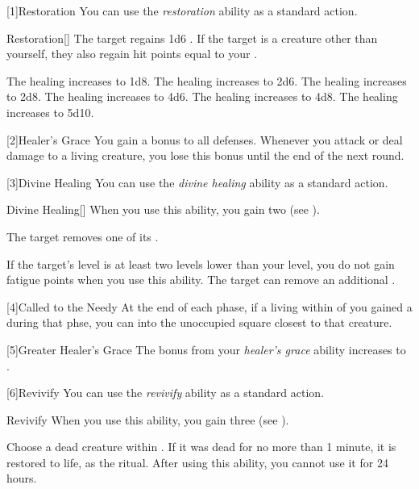         [1]{Restoration} You can use the \textit{restoration} ability as a standard action.
        \begin{freeability}{Restoration}[]
            The target regains 1d6 .
            If the target is a creature other than yourself, they also regain hit points equal to your .

            \rankline
             The healing increases to 1d8.
             The healing increases to 2d6.
             The healing increases to 2d8.
             The healing increases to 4d6.
             The healing increases to 4d8.
             The healing increases to 5d10.
        \end{freeability}

        [2]{Healer's Grace} You gain a  bonus to all defenses.
        Whenever you attack or deal damage to a living creature, you lose this bonus until the end of the next round.

        [3]{Divine Healing} You can use the \textit{divine healing} ability as a standard action.
        \begin{freeability}{Divine Healing}[]
            When you use this ability, you gain two  (see ).

            The target removes one of its .

            \rankline
             If the target's level is at least two levels lower than your level,
                you do not gain fatigue points when you use this ability.
             The target can remove an additional .
        \end{freeability}

        [4]{Called to the Needy} At the end of each phase, if a living  within \distrange of you gained a  during that phse, you can  into the unoccupied square closest to that creature.

        [5]{Greater Healer's Grace} The bonus from your \textit{healer's grace} ability increases to .

        [6]{Revivify} You can use the \textit{revivify} ability as a standard action.
        \begin{freeability}{Revivify}
            When you use this ability, you gain three  (see ).

            Choose a dead creature within .
            If it was dead for no more than 1 minute, it is restored to life, as the  ritual.
            After using this ability, you cannot use it for 24 hours.
        \end{freeability}


